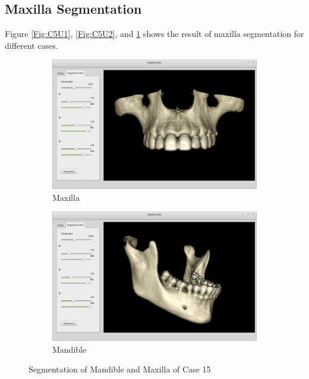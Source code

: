 \documentclass[11pt, b5paper]{article}
\begin{document}
\subsection{Maxilla Segmentation}
Figure \ref{Fig:C5U1}, \ref{Fig:C5U2}, and \ref{fig:C15U} shows the result of maxilla segmentation for different cases.
\begin{figure}
    \centering
    \begin{subfigure}[b]{0.75\textwidth}
        \centering
        \includegraphics[width=\textwidth]{C15U}
        \caption{Maxilla}
        \label{fig:C15U}
    \end{subfigure}
    \hfill
    \begin{subfigure}[b]{0.75\textwidth}
        \centering
        \includegraphics[width=\textwidth]{C15L}
        \caption{Mandible}
    \end{subfigure}
    \caption{Segmentation of Mandible and Maxilla of Case 15}
    \label{fig:C15}
\end{figure}
\end{document}
